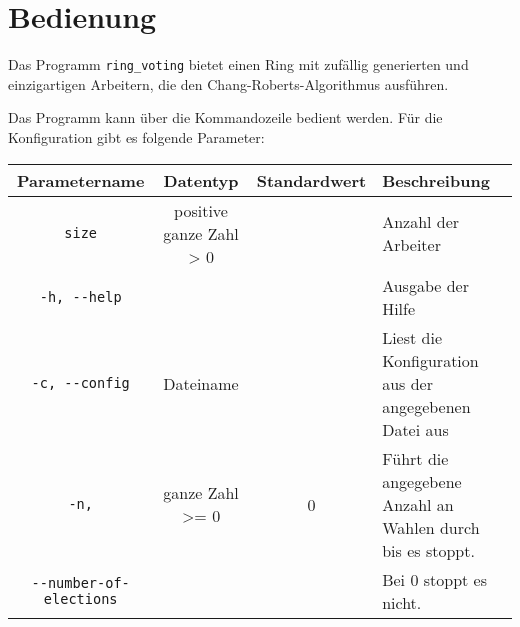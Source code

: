 \section{Bedienung}

Das Programm \verb|ring_voting| bietet einen Ring mit zufällig generierten und einzigartigen Arbeitern, die den Chang-Roberts-Algorithmus ausführen.

Das Programm kann über die Kommandozeile bedient werden. Für die Konfiguration gibt es folgende Parameter:

\begin{center}
\begin{tabular}{ | c | c | c | p{3cm} | }
\hline
\textbf{Parametername} & \textbf{Datentyp} & \textbf{Standardwert} & \textbf{Beschreibung} \\
\hline
 \verb|size| & positive ganze Zahl > 0 &  & Anzahl der Arbeiter  \\ \hline
 \verb|-h, --help| &  & & Ausgabe der Hilfe \\  \hline
 \verb|-c, --config| & Dateiname & & Liest die Konfiguration aus der angegebenen Datei aus \\ \hline
 \verb|-n,| & ganze Zahl >= 0 & 0 & Führt die angegebene Anzahl an Wahlen durch bis es stoppt. \\ 
 \verb|--number-of-elections| & & & Bei 0 stoppt es nicht. \\ \hline
\end{tabular}
\end{center}

